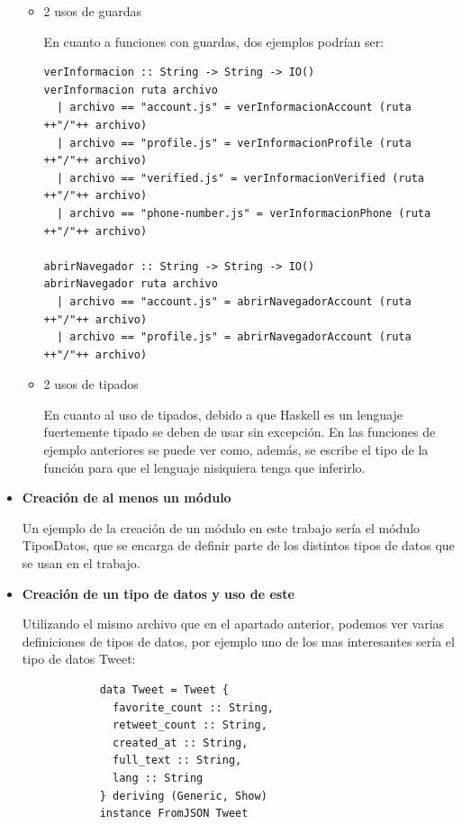 \documentclass[11pt]{article}
\begin{document}
\begin{itemize}
\begin{itemize}
        \medskip
        \item 2 usos de guardas
        
        En cuanto a funciones con guardas, dos ejemplos podrían ser:
        
        \begin{verbatim}
verInformacion :: String -> String -> IO()
verInformacion ruta archivo
  | archivo == "account.js" = verInformacionAccount (ruta ++"/"++ archivo)
  | archivo == "profile.js" = verInformacionProfile (ruta ++"/"++ archivo)
  | archivo == "verified.js" = verInformacionVerified (ruta ++"/"++ archivo)
  | archivo == "phone-number.js" = verInformacionPhone (ruta ++"/"++ archivo)
  
abrirNavegador :: String -> String -> IO()
abrirNavegador ruta archivo
  | archivo == "account.js" = abrirNavegadorAccount (ruta ++"/"++ archivo)
  | archivo == "profile.js" = abrirNavegadorAccount (ruta ++"/"++ archivo)
            \end{verbatim}
        
        \item 2 usos de tipados
        
        En cuanto al uso de tipados, debido a que Haskell es un lenguaje fuertemente tipado se deben de usar sin excepción. En las funciones de ejemplo anteriores se puede ver como, además, se escribe el tipo de la función para que el lenguaje nisiquiera tenga que inferirlo.
        
        
    \end{itemize}
    
    \item \textbf{Creación de al menos un módulo}
    
    Un ejemplo de la creación de un módulo en este trabajo sería el módulo TiposDatos, que se encarga de definir parte de los distintos tipos de datos que se usan en el trabajo.
    
    \item \textbf{Creación de un tipo de datos y uso de este}
    
    Utilizando el mismo archivo que en el apartado anterior, podemos ver varias definiciones de tipos de datos, por ejemplo uno de los mas interesantes sería el tipo de datos Tweet:
    
        \begin{verbatim}
            data Tweet = Tweet {
              favorite_count :: String,
              retweet_count :: String,
              created_at :: String,
              full_text :: String,
              lang :: String
            } deriving (Generic, Show)
            instance FromJSON Tweet
        \end{verbatim}
        

\end{itemize}
\end{document}

